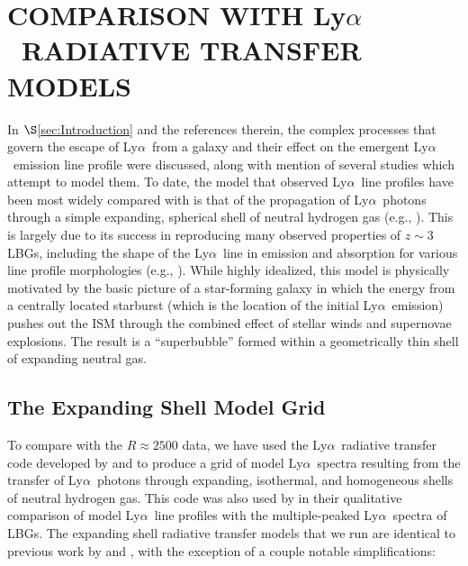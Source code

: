 \documentclass{emulateapj}
\newcommand{\lya}{Ly$\alpha$}
\begin{document}
\section{COMPARISON WITH \lya\ RADIATIVE TRANSFER MODELS}\label{sec:Models}
In $\S$\ref{sec:Introduction} and the references therein, the complex processes that govern the escape of \lya\ from a galaxy and their effect on the emergent \lya\ emission line profile were discussed, along with mention of several studies which attempt to model them. To date, the model that observed \lya\ line profiles have been most widely compared with is that of the propagation of \lya\ photons through a simple expanding, spherical shell of neutral hydrogen gas (e.g., \citealp{verhamme2006,barnes2010,schaerer2011}). This is largely due to its success in reproducing many observed properties of $z\sim3$ LBGs, including the shape of the \lya\ line in emission and absorption for various line profile morphologies (e.g., \citealp{schaerer2008,verhamme2008}). While highly idealized, this model is physically motivated by the basic picture of a star-forming galaxy in which the energy from a centrally located starburst (which is the location of the initial \lya\ emission) pushes out the ISM through the combined effect of stellar winds and supernovae explosions. The result is a ``superbubble'' formed within a geometrically thin shell of expanding neutral gas.

\subsection{The Expanding Shell Model Grid}\label{subsec:ModelGrid}
To compare with the $R\approx2500$ data, we have used the \lya\ radiative transfer code developed by \citet{zheng2002} and \citet{kollmeier2010} to produce a grid of model \lya\ spectra resulting from the transfer of \lya\ photons through expanding, isothermal, and homogeneous shells of neutral hydrogen gas. This code was also used by \citet{kulas2012} in their qualitative comparison of model \lya\ line profiles with the multiple-peaked \lya\ spectra of LBGs. The expanding shell radiative transfer models that we run are identical to previous work by \citet{verhamme2006} and \citet{schaerer2011}, with the exception of a couple notable simplifications:
\end{document}
